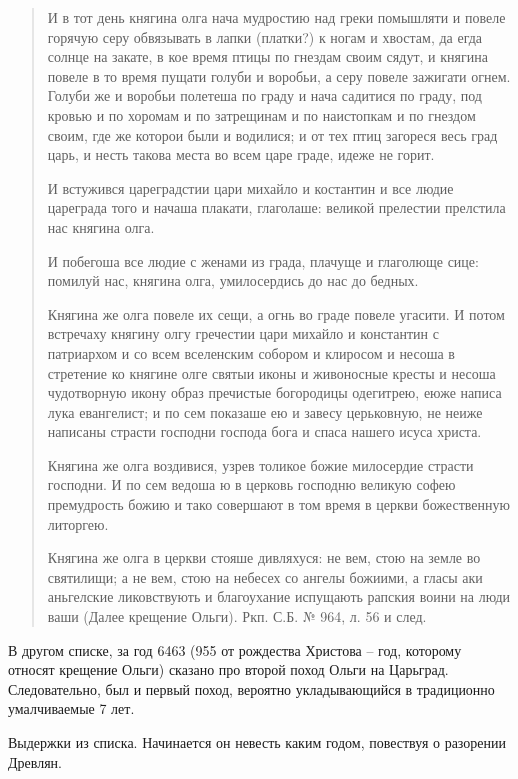 \begin{quotation}
И в тот день княгина олга нача мудростию над греки помышляти и повеле горячую серу обвязывать в лапки (платки?) к ногам и хвостам, да егда солнце на закате, в кое время птицы по гнездам своим сядут, и княгина повеле в то время пущати голуби и воробьи, а серу повеле зажигати огнем. Голуби же и воробьи полетеша по граду и нача садитися по граду, под кровью и по хоромам и по затрещинам и по наистопкам и по гнездом своим, где же которои были и водилися; и от тех птиц загореся весь град царь, и несть такова места во всем царе граде, идеже не горит.

И встужився цареградстии цари михайло и костантин и все людие цареграда того и начаша плакати, глаголаше: великой прелестии прелстила нас княгина олга.

И побегоша все людие с женами из града, плачуще и глаголюще сице: помилуй нас, княгина олга, умилосердись до нас до бедных.

Княгина же олга повеле их сещи, а огнь во граде повеле угасити. И потом встречаху княгину олгу гречестии цари михайло и константин с патриархом и со всем вселенским собором и клиросом и несоша в стретение ко княгине олге святыи иконы и живоносные кресты и несоша чудотворную икону образ пречистые богородицы одегитрею, еюже написа лука евангелист; и по сем показаше ею и завесу церьковную, не неиже написаны страсти господни господа бога и спаса нашего исуса христа.

Княгина же олга воздивися, узрев толикое божие милосердие страсти господни. И по сем ведоша ю в церковь господню великую софею премудрость божию и тако совершают в том время в церкви божественную литоргею. 

Княгина же олга в церкви стояше дивляхуся: не вем, стою на земле во святилищи; а не вем, стою на небесех со ангелы божиими, а гласы аки аньгелские ликовствують и благоухание испущають рапския воини на люди ваши (Далее крещение Ольги). Ркп. С.Б. № 964, л. 56 и след.
\end{quotation}

В другом списке, за год 6463 (955 от рождества Христова – год, которому относят крещение Ольги) сказано про второй поход Ольги на Царьград. Следовательно, был и первый поход, вероятно укладывающийся в традиционно умалчиваемые 7 лет. 

Выдержки из списка. Начинается он невесть каким годом, повествуя о разорении Древлян.

